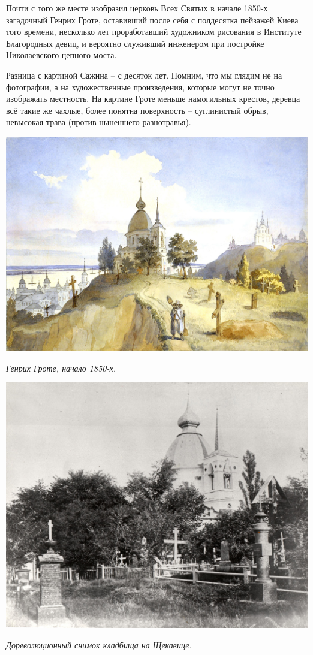 Почти с того же месте изобразил церковь Всех Святых в начале 1850-х загадочный Генрих Гроте, оставивший после себя с полдесятка пейзажей Киева того времени, несколько лет проработавший художником рисования в Институте Благородных девиц, и вероятно служивший инженером при постройке Николаевского цепного моста.

Разница с картиной Сажина – с десяток лет. Помним, что мы глядим не на фотографии, а на художественные произведения, которые могут не точно изображать местность. На картине Гроте меньше намогильных крестов, деревца всё такие же чахлые, более понятна поверхность – суглинистый обрыв, невысокая трава (против нынешнего разнотравья).

\begin{center}
\includegraphics[width=\linewidth]{chast-colebanie-osnov/sheka/grote.jpg}

\textit{Генрих Гроте, начало 1850-х.}
\end{center}





\begin{center}
\includegraphics[width=0.70\linewidth]{chast-colebanie-osnov/sheka/sheka_kladb2.jpg}

\textit{Дореволюционный снимок кладбища на Щекавице.}
\end{center}



